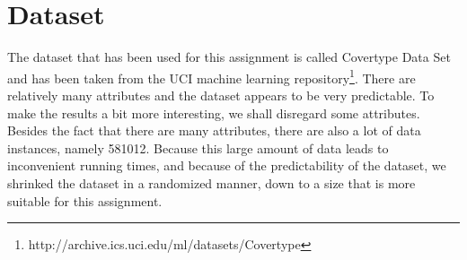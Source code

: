 \documentclass[12pt]{article}
\theoremstyle{definition}
\begin{document}
\maketitle

\section{Dataset}
\label{sec:dataset}

The dataset that has been used for this assignment is called Covertype Data Set and has been
taken from the UCI machine learning
repository\footnote{http://archive.ics.uci.edu/ml/datasets/Covertype}.
There are relatively many attributes and the dataset appears to be very predictable.
To make the results a bit more interesting, we shall disregard some attributes.
Besides the fact that there are many attributes, there are also a lot of data instances,
namely 581012.
Because this large amount of data leads to inconvenient running times, and because of the
predictability of the dataset, we shrinked the dataset in a randomized manner,
down to a size that is more suitable for this assignment.
\end{document}
